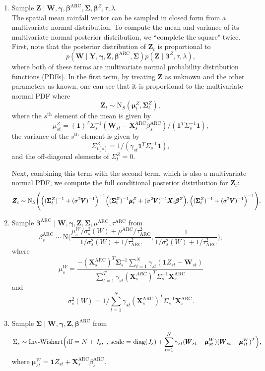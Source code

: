 \documentclass[12pt]{article}
\def\bbeta{\pmb{\beta}}
\def\bgamma{\pmb{\gamma}}
\def\bmu{\pmb{\mu}}
\def\bSigma{\pmb{\Sigma}}
\def\bX{\pmb{X}}
\def\bY{\pmb{Y}}
\def\bZ{\pmb{Z}}
\def\bV{\pmb{V}}
\def\bW{\pmb{W}}
\begin{document}
\begin{enumerate}
\item Sample $\bZ \mid \bW, \bgamma, \bbeta^\text{ARC}, \bSigma, \bbeta^Z, \tau, \lambda$. \\
The spatial mean rainfall vector can be sampled in closed form from a multivariate normal distribution. To compute the mean and variance of its multivariate normal posterior distribution, we ``complete the square" twice. First, note that the posterior distribution of $\bZ_t$ is proportional to
$$
p(\bW \mid \bY, \bgamma, \bZ, \bbeta^\text{ARC}, \bSigma) p(\bZ \mid \bbeta^Z, \tau, \lambda),
$$
where both of these terms are multivariate normal probability distribution functions (PDFs). In the first term, by treating $\bZ$ as unknown and the other parameters as known, one can see that it is proportional to the multivariate normal PDF where
$$
\bZ_t \sim \text{N}_S(\bmu^Z_t, \bSigma_t^Z),
$$
where the $s^\text{th}$ element of the mean is given by
$$
\mu^Z_{st} = (\mathbf{1})^T \Sigma_s^{-1}(\bW_{st} - \bX_s^\text{ARC}\beta_s^\text{ARC})/(\mathbf{1}^T \Sigma_s^{-1} \mathbf{1}),
$$
the variance of the $s^\text{th}$ element is given by
$$
\Sigma_{t[s]}^Z = 1/(\gamma_{st}\mathbf{1}^T \Sigma_s^{-1} \mathbf{1}),
$$
and the off-diagonal elements of $\Sigma_t^Z = 0$.

Next, combining this term with the second term, which is also a multivariate normal PDF, we compute the full conditional posterior distribution for $\bZ_t$:
$$
\bZ_t \sim \text{N}_S\Biggl(\Bigl((\bSigma_t^Z)^{-1} + (\sigma^2\bV)^{-1}\Bigr)^{-1}\Bigl((\bSigma_t^Z)^{-1}\bmu_t^Z + (\sigma^2\bV)^{-1}\bX_t\bbeta^Z\Bigr), \Bigl((\bSigma_t^Z)^{-1} + (\sigma^2\bV)^{-1}\Bigr)^{-1}\Biggr).
$$


\item Sample $\bbeta^\text{ARC} \mid \bW, \bgamma, \bZ, \bSigma, \mu^\text{ARC}, \tau^\text{ARC}$ from
$$
\beta_s^\text{ARC} \sim \text{N}\Biggl(\frac{\mu_s^W/\sigma_s^2(W) + \mu^\text{ARC}/\tau_\text{ARC}^2}{1/\sigma_s^2(W) + 1/\tau_\text{ARC}^2}, \frac{1}{1/\sigma_s^2(W) + 1/\tau_\text{ARC}^2}\Biggr),
$$
where
$$
\mu_s^W = \frac{-(\bX_s^\text{ARC})^T \bSigma_s^{-1} \sum_{t = 1}^N \gamma_{st} (\mathbf{1} Z_{st} - \bW_{st})}{\sum_{t=1}^T \gamma_{st}(\bX^{ARC}_s)^T \Sigma_s^{-1} \bX_s^\text{ARC}}
$$
and
$$
\sigma_s^2(W) = 1/\sum_{t=1}^N \gamma_{st}(\bX^\text{ARC}_s)^T \Sigma_s^{-1} \bX_s^\text{ARC}.
$$


\item Sample $\bSigma \mid \bW, \bgamma, \bZ, \bbeta^\text{ARC}$ from \\
$$
\Sigma_s \sim \text{Inv-Wishart}\Bigl(\text{df = }N + J_s, \text{ , scale = diag}(J_s) + \sum_{t=1}^N \gamma_{st}(\bW_{st} - \bmu^W_{st})(\bW_{st} - \bmu^W_{st})^T\Bigr),
$$
where 
$
\bmu^W_{st} = \mathbf{1}Z_{st} + \bX_{s}^\text{ARC}\beta_s^\text{ARC}.
$



\end{enumerate}
\end{document}
